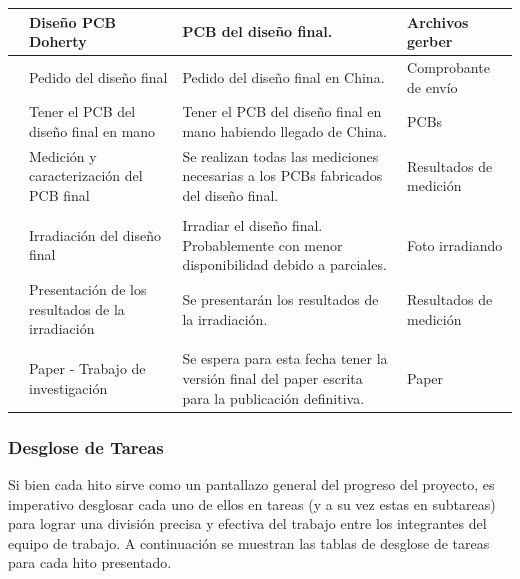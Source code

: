 \begin{xltabular}{\textwidth}{>{\centering\arraybackslash}p{0.6cm} X X p{2.5cm}}
     & Diseño PCB Doherty & PCB del diseño final. & Archivos gerber \\
    
     & Pedido del diseño final & Pedido del diseño final en China. & Comprobante de envío \\
    
     & Tener el PCB del diseño final en mano & Tener el PCB del diseño final en mano habiendo llegado de China. & PCBs \\
    
     & Medición y caracterización del PCB final & Se realizan todas las mediciones necesarias a los PCBs fabricados del diseño final. & Resultados de medición \\
    
    \hline
      \\
    
     & Irradiación del diseño final & Irradiar el diseño final. Probablemente con menor disponibilidad debido a parciales. & Foto irradiando \\
    
     & Presentación de los resultados de la irradiación & Se presentarán los resultados de la irradiación. & Resultados de medición \\
    
    \hline
      \\
    
     & Paper - Trabajo de investigación & Se espera para esta fecha tener la versión final del paper escrita para la publicación definitiva. & Paper \\

    \hline
\end{xltabular}

\subsubsection{Desglose de Tareas}
Si bien cada hito sirve como un pantallazo general del progreso del proyecto, es imperativo desglosar cada uno de ellos en tareas (y a su vez estas en subtareas) para lograr una división precisa y efectiva del trabajo entre los integrantes del equipo de trabajo. A continuación se muestran las tablas de desglose de tareas para cada hito presentado.

